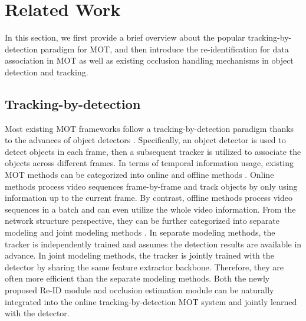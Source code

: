 \documentclass[final,1p,times,twocolumn]{elsarticle}
\begin{document}
	\section{Related Work}
	\label{section:related_work}
	In this section, we first provide a brief overview about the popular tracking-by-detection paradigm for MOT, and then introduce the re-identification for data association in MOT as well as existing occlusion handling mechanisms in object detection and tracking.
	
	\subsection{Tracking-by-detection}
	Most existing MOT frameworks follow a tracking-by-detection paradigm thanks to the advances of object detectors \cite{ren2016faster, he2017mask, law2018cornernet, zhou2019objects}. Specifically, an object detector is used to detect objects in each frame, then a subsequent tracker is utilized to associate the objects across different frames. In terms of temporal information usage, existing MOT methods can be categorized into online
	\cite{wojke2017simple, bergmann2019tracking, liugsm, zhou2020tracking, zhang2020fairmot} and offline methods \cite{braso2020learning, hornakova2020lifted}. Online methods process video sequences frame-by-frame and track objects by only using information up to the current frame. By contrast, offline methods process video sequences in a batch and can even utilize the whole video information. From the network structure perspective, they can be further categorized into separate modeling 
	\cite{wojke2017simple,bergmann2019tracking,liugsm, braso2020learning, hornakova2020lifted} and joint modeling methods \cite{zhou2020tracking, zhang2020fairmot, wang2019towards}. 
	In separate modeling methods, the tracker is independently trained and assumes the detection results are available in advance. In joint modeling methods, the tracker is jointly trained with the detector by sharing the same feature extractor backbone. Therefore, they are often more efficient than the separate modeling methods. Both the newly proposed Re-ID module and occlusion estimation module can be naturally integrated into the online tracking-by-detection MOT system and jointly learned with the detector.
	
\end{document}
